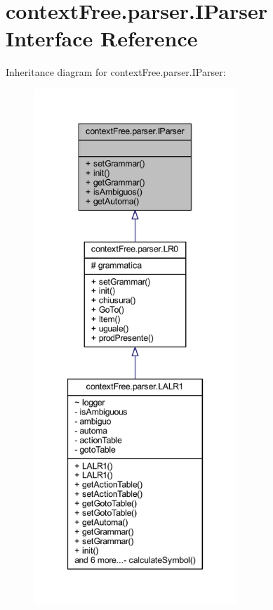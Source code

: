 \hypertarget{interfacecontext_free_1_1parser_1_1_i_parser}{\section{context\-Free.\-parser.\-I\-Parser Interface Reference}
\label{interfacecontext_free_1_1parser_1_1_i_parser}
}


Inheritance diagram for context\-Free.\-parser.\-I\-Parser\-:
\nopagebreak
\begin{figure}[H]
\begin{center}
\leavevmode
\includegraphics[height=550pt]{interfacecontext_free_1_1parser_1_1_i_parser__inherit__graph}
\end{center}
\end{figure}
